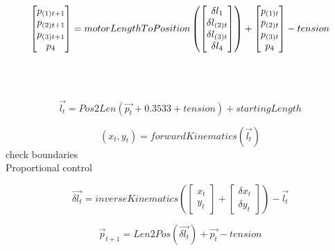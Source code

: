 \documentclass{article}
\begin{document}
\[
\begin{bmatrix}
p_{(1)t+1}\\
p_{(2)t+1}\\
p_{(3)t+1}\\
p_4
\end{bmatrix}
=
motorLengthToPosition \left(
\begin{bmatrix}
\delta{l_1}\\
\delta{l_{(2)t}}\\
\delta{l_{(3)t}}\\
\delta{l_4}
\end{bmatrix}
\right)
+ 
\begin{bmatrix}
p_{(1)t}\\
p_{(2)t}\\
p_{(3)t}\\
p_4
\end{bmatrix}
- tension
\\ \\ \\ \\
\]
\\ \\ \\
\[
\vec{l_t} = Pos2Len
\left(
\vec{p_t} + 0.3533 + tension
\right) + startingLength
\]

\[
(x_t,y_t) = forwardKinematics \left(
\vec{l_t}
\right)
\]
check boundaries \\
Proportional control

\[
\vec{\delta{l_t}} = inverseKinematics \left(
\begin{bmatrix}
x_t\\
y_t
\end{bmatrix}
 + 
\begin{bmatrix}
\delta{x_t}\\
\delta{y_t}
\end{bmatrix}
\right)
- \vec{l_t}
\]


\[
\vec{p}_{t+1} = Len2Pos \left(
\vec{\delta{l_t}}
\right)
+ \vec{p_t} - tension
\]
\end{document}
